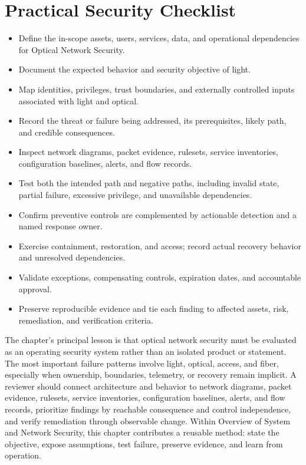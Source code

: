 \documentclass[11pt]{article}
\begin{document}
\section*{Practical Security Checklist}
\begin{itemize}[label=$\square$]
\item Define the in-scope assets, users, services, data, and operational dependencies for Optical Network Security.
\item Document the expected behavior and security objective of light.
\item Map identities, privileges, trust boundaries, and externally controlled inputs associated with light and optical.
\item Record the threat or failure being addressed, its prerequisites, likely path, and credible consequences.
\item Inspect network diagrams, packet evidence, rulesets, service inventories, configuration baselines, alerts, and flow records.
\item Test both the intended path and negative paths, including invalid state, partial failure, excessive privilege, and unavailable dependencies.
\item Confirm preventive controls are complemented by actionable detection and a named response owner.
\item Exercise containment, restoration, and access; record actual recovery behavior and unresolved dependencies.
\item Validate exceptions, compensating controls, expiration dates, and accountable approval.
\item Preserve reproducible evidence and tie each finding to affected assets, risk, remediation, and verification criteria.
\end{itemize}
\begin{synthesisbox}
The chapter's principal lesson is that optical network security must be evaluated as an operating security system rather than an isolated product or statement. The most important failure patterns involve light, optical, access, and fiber, especially when ownership, boundaries, telemetry, or recovery remain implicit. A reviewer should connect architecture and behavior to network diagrams, packet evidence, rulesets, service inventories, configuration baselines, alerts, and flow records, prioritize findings by reachable consequence and control independence, and verify remediation through observable change. Within Overview of System and Network Security, this chapter contributes a reusable method: state the objective, expose assumptions, test failure, preserve evidence, and learn from operation.
\end{synthesisbox}
\end{document}
